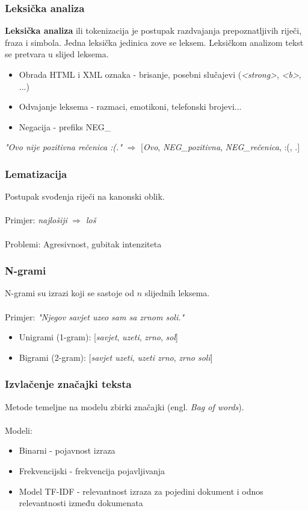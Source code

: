 \documentclass[utf8]{beamer}
\begin{document}
\begin{frame}
\frametitle{Leksička analiza}
\textbf{Leksička analiza} ili tokenizacija je postupak razdvajanja prepoznatljivih riječi, fraza i simbola. Jedna leksička jedinica zove se leksem. Leksičkom analizom tekst se pretvara u slijed leksema.

\begin{itemize}
\item Obrada HTML i XML oznaka - brisanje, posebni slučajevi (\textit{<strong>}, \textit{<b>}, ...)
\item Odvajanje leksema - razmaci, emotikoni, telefonski brojevi...
\item Negacija - prefiks NEG\_
\end{itemize}

\textit{"Ovo nije pozitivna rečenica :(."} $\Longrightarrow$
[\textit{Ovo}, \textit{NEG\_pozitivna}, \textit{NEG\_rečenica}, :(,  .]
\end{frame}

\begin{frame}
\frametitle{Lematizacija}
Postupak svođenja riječi na kanonski oblik. \\~\\

Primjer: \textit{najlošiji} $\Longrightarrow$ \textit{loš} \\~\\

Problemi: Agresivnost, gubitak intenziteta
\end{frame}

\begin{frame}
\frametitle{N-grami}

N-grami su izrazi koji se sastoje od $n$ slijednih leksema. \\~\\

Primjer: \textit{"Njegov savjet uzeo sam sa zrnom soli."}
\begin{itemize}
\item Unigrami (1-gram): [\textit{savjet}, \textit{uzeti}, \textit{zrno}, \textit{sol}]
\item Bigrami (2-gram): [\textit{savjet uzeti}, \textit{uzeti zrno}, 
\textit{zrno soli}]
\end{itemize}
\end{frame}

\begin{frame}
\frametitle{Izvlačenje značajki teksta}

Metode temeljne na modelu zbirki značajki (engl. \textit{Bag of words}). \\~\\

Modeli:
\begin{itemize}
\item Binarni - pojavnost izraza
\item Frekvencijski - frekvencija pojavljivanja
\item Model TF-IDF - relevantnost izraza za pojedini dokument i odnos relevantnosti između dokumenata
\end{itemize}
\end{frame}
\end{document}
